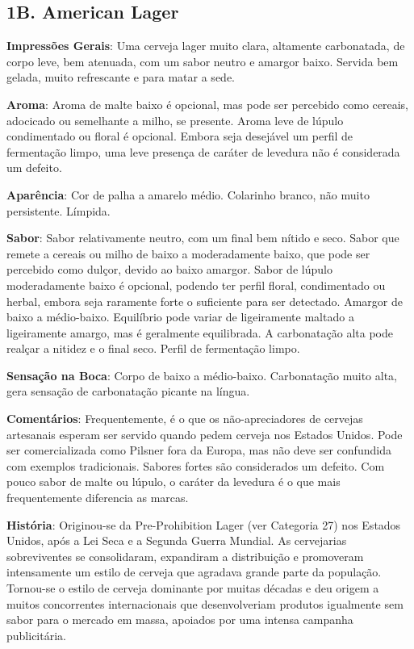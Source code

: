 \subsection*{1B. American Lager}
\textbf{Impressões Gerais}: Uma cerveja lager muito clara, altamente carbonatada, de corpo leve, bem atenuada, com um sabor neutro e amargor baixo. Servida bem gelada, muito refrescante e para matar a sede.

\textbf{Aroma}: Aroma de malte baixo é opcional, mas pode ser percebido como cereais, adocicado ou semelhante a milho, se presente. Aroma leve de lúpulo condimentado ou floral é opcional. Embora seja desejável um perfil de fermentação limpo, uma leve presença de caráter de levedura não é considerada um defeito.

\textbf{Aparência}: Cor de palha a amarelo médio. Colarinho branco, não muito persistente. Límpida.

\textbf{Sabor}: Sabor relativamente neutro, com um final bem nítido e seco. Sabor que remete a cereais ou milho de baixo a moderadamente baixo, que pode ser percebido como dulçor, devido ao baixo amargor. Sabor de lúpulo moderadamente baixo é opcional, podendo ter perfil floral, condimentado ou herbal, embora seja raramente forte o suficiente para ser detectado. Amargor de baixo a médio-baixo. Equilíbrio pode variar de ligeiramente maltado a ligeiramente amargo, mas é geralmente equilibrada. A carbonatação alta pode realçar a nitidez e o final seco. Perfil de fermentação limpo.

\textbf{Sensação na Boca}: Corpo de baixo a médio-baixo. Carbonatação muito alta, gera sensação de carbonatação picante na língua.

\textbf{Comentários}: Frequentemente, é o que os não-apreciadores de cervejas artesanais esperam ser servido quando pedem cerveja nos Estados Unidos. Pode ser comercializada como Pilsner fora da Europa, mas não deve ser confundida com exemplos tradicionais. Sabores fortes são considerados um defeito. Com pouco sabor de malte ou lúpulo, o caráter da levedura é o que mais frequentemente diferencia as marcas.

\textbf{História}: Originou-se da Pre-Prohibition Lager (ver Categoria 27) nos Estados Unidos, após a Lei Seca e a Segunda Guerra Mundial. As cervejarias sobreviventes se consolidaram, expandiram a distribuição e promoveram intensamente um estilo de cerveja que agradava grande parte da população. Tornou-se o estilo de cerveja dominante por muitas décadas e deu origem a muitos concorrentes internacionais que desenvolveriam produtos igualmente sem sabor para o mercado em massa, apoiados por uma intensa campanha publicitária.

